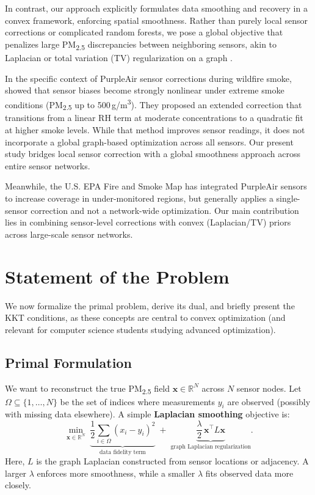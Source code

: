 \documentclass[12pt]{article}                                %
\begin{document}
In contrast, our approach explicitly formulates data smoothing and recovery in a convex framework, 
enforcing spatial smoothness. Rather than purely local sensor corrections or complicated random 
forests, we pose a global objective that penalizes large PM\textsubscript{2.5} discrepancies 
between neighboring sensors, akin to Laplacian or total variation (TV) regularization on a graph 
\cite{ShumanGSP}.

In the specific context of PurpleAir sensor corrections during wildfire smoke, \cite{Barkjohn2022Sensors} 
showed that sensor biases become strongly nonlinear under extreme smoke conditions 
(PM\textsubscript{2.5} up to 500\,\textmu g/m\textsuperscript{3}). They proposed an extended 
correction that transitions from a linear RH term at moderate concentrations to a quadratic fit 
at higher smoke levels. While that method improves sensor readings, it does not incorporate a 
global graph-based optimization across all sensors. Our present study bridges local sensor 
correction with a global smoothness approach across entire sensor networks.

Meanwhile, the U.S. EPA Fire and Smoke Map \cite{EPAwebinar2021} has integrated PurpleAir sensors 
to increase coverage in under-monitored regions, but generally applies a single-sensor correction 
and not a network-wide optimization. Our main contribution lies in combining sensor-level 
corrections with convex (Laplacian/TV) priors across large-scale sensor networks.

\section{Statement of the Problem}
\label{sec:problem-statement}   %

We now formalize the primal problem, derive its dual, and briefly present the KKT conditions, 
as these concepts are central to convex optimization (and relevant for computer science 
students studying advanced optimization).

\subsection{Primal Formulation}  %
We want to reconstruct the true PM\textsubscript{2.5} field $\mathbf{x}\in\mathbb{R}^N$ across 
$N$ sensor nodes. Let $\Omega \subseteq \{1,\dots,N\}$ be the set of indices where measurements 
$y_i$ are observed (possibly with missing data elsewhere). A simple \textbf{Laplacian smoothing} 
objective is:
\begin{equation}
\label{eq:primal}
\min_{\mathbf{x}\in\mathbb{R}^N} \; 
\underbrace{\frac{1}{2}\sum_{i\in \Omega}(x_i - y_i)^2}_{\text{data fidelity term}} 
\;+\; \underbrace{\frac{\lambda}{2}\, \mathbf{x}^\top L \mathbf{x}}_{\text{graph Laplacian regularization}}.
\end{equation}
Here, $L$ is the graph Laplacian constructed from sensor locations or adjacency. A larger $\lambda$ 
enforces more smoothness, while a smaller $\lambda$ fits observed data more closely.
\end{document}
